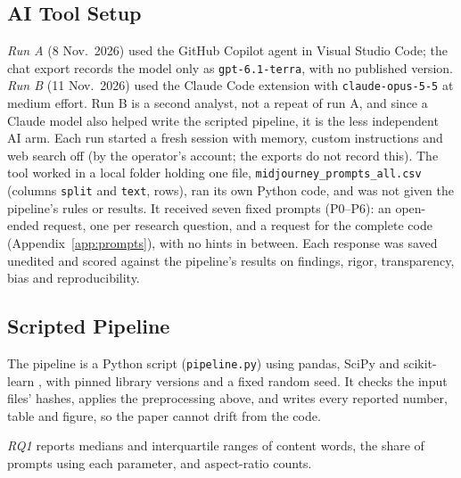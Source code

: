 \documentclass[conference]{IEEEtran}
\begin{document}
\begin{table}[t]
\centering
\caption{Row types in the raw data (all splits).}
\label{tab:fragments}

\end{table}

\begin{table}[t]
\centering
\caption{From raw rows to clean prompts.}
\label{tab:flow}

\end{table}

\subsection{AI Tool Setup}
\textit{Run A} (8 Nov.\ 2026) used the GitHub Copilot agent in Visual
Studio Code; the chat export records the model only as
\texttt{gpt-6.1-terra}, with no published version. \textit{Run B} (11 Nov.\
2026) used the Claude Code extension with \texttt{claude-opus-5-5} at medium
effort. Run B is a second analyst, not a repeat of run A, and since a Claude model also helped write the scripted pipeline, it is the
less independent AI arm.
Each run started a fresh session with memory, custom instructions and web
search off (by the operator's account; the exports do not record this). The
tool worked in a local folder holding one file,
\texttt{midjourney\_prompts\_all.csv} (columns \texttt{split} and
\texttt{text}, \NRaw{} rows), ran its own Python code, and was not given the pipeline's rules or results. It received seven fixed prompts (P0--P6): an
open-ended request, one per research question, and a request for the
complete code (Appendix~\ref{app:prompts}), with no hints in between. Each
response was saved unedited and scored against the pipeline's results on findings,
rigor, transparency, bias and reproducibility.

\subsection{Scripted Pipeline}
The pipeline is a Python script (\texttt{pipeline.py}) using pandas, SciPy
and scikit-learn \cite{pedregosaScikitlearn2011}, with pinned library
versions and a fixed random seed. It checks the input files' hashes,
applies the preprocessing above, and writes every reported number, table
and figure, so the paper cannot drift from the code.

\textit{RQ1} reports medians and interquartile ranges of content words,
the share of prompts using each parameter, and aspect-ratio counts.
\end{document}
